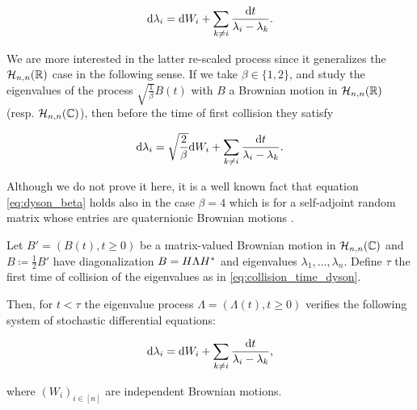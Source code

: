 \begin{equation*}
        \mathrm d \lambda_i = \mathrm d W_i + \sum_{k\neq i} \frac{\mathrm d t}{\lambda_i - \lambda_k}.
\end{equation*}

We are more interested in the latter re-scaled process since it generalizes the $\mathcal H_{n,n}(\mathbb R)$ case in the following sense. If we take $\beta \in \{1,2\}$, and study the eigenvalues of the process $\sqrt{\frac{1}{\beta}}B(t)$ with $B$ a Brownian motion in $\mathcal H_{n,n}(\mathbb R)$ (resp. $\mathcal H_{n,n}(\mathbb C)$), then before the time of first collision they satisfy

\begin{equation}
        \mathrm d \lambda_i = \sqrt{\frac{2}{\beta}}\mathrm d W_i + \sum_{k\neq i} \frac{\mathrm d t}{\lambda_i - \lambda_k}. \label{eq:dyson_beta}
\end{equation}

Although we do not prove it here, it is a well known fact that equation \eqref{eq:dyson_beta} holds also in the case $\beta = 4$ which is for a self-adjoint random matrix whose entries are quaternionic Brownian motions \cite{article:dyson}.

\begin{theorem} \label{thm:dyson_complejo}
    Let $B' = (B(t), t \ge 0)$ be a matrix-valued Brownian motion in $\mathcal H_{n,n}(\mathbb C)$ and $B\coloneqq \frac{1}{2}B'$ have diagonalization $B = H \Lambda H^*$ and eigenvalues $\lambda_1, \dots, \lambda_n$. Define $\tau$ the first time of collision of the eigenvalues as in \eqref{eq:collision_time_dyson}.

    Then, for $t < \tau$ the eigenvalue process $\Lambda = (\Lambda(t), t\ge 0)$ verifies the following system of stochastic differential equations:

    \begin{equation}
        \mathrm d \lambda_i = \mathrm d W_i + \sum_{k\neq i} \frac{\mathrm d t}{\lambda_i - \lambda_k},
    \end{equation}

    \noindent where $(W_i)_{i\in[n]}$ are independent Brownian motions.
\end{theorem}


